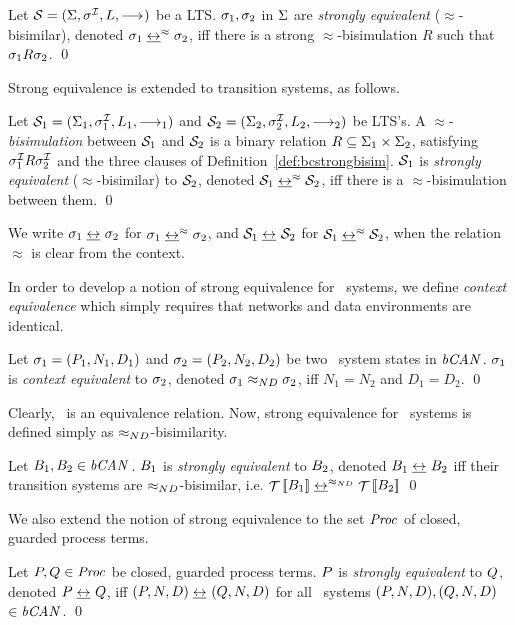 \begin{definition}
Let $\SS = (\States, \Init, \Labels, \TRel)$ be a LTS. $\state_1,
\state_2$ in $\States$ are \emph{strongly equivalent}
($\approx$-bisimilar), denoted $\state_1 \eqbisim \state_2$, iff there
is a strong $\approx$-bisimulation $R$ such that $\state_1 R \state_2$.
\qed
\end{definition}
Strong equivalence is extended to transition systems, as follows.
\begin{definition}\label{def:bcsbisimtsys}
Let $\SS_1 = (\States_1, \Init_1, \Labels_1, {}\lgoes{1}{})$ and
$\SS_2 = (\States_2, \Init_2, \Labels_2, {}\lgoes{2}{})$ be LTS's.
A $\approx$-\emph{bisimulation} between $\SS_1$ and $\SS_2$ is a binary 
relation $R \subseteq \States_1 \cross \States_2$, satisfying
$\Init_1 R \Init_2$ and the three clauses of 
Definition~\ref{def:bcstrongbisim}.
$\SS_1$ is \emph{strongly equivalent} ($\approx$-bisimilar)
to $\SS_2$, denoted $\SS_1 \eqbisim \SS_2$, iff there is a 
$\approx$-bisimulation between them.
\qed
\end{definition}

\begin{notation}
We write $\state_1 \bisim \state_2$ for $\state_1 \eqbisim \state_2$, and
$\SS_1 \bisim \SS_2$ for $\SS_1 \eqbisim \SS_2$, when the relation
$\approx$ is clear from the context.
\end{notation}

In order to develop a notion of strong equivalence for \bcandle\ systems,
we define \emph{context equivalence} which simply requires that
networks and data environments are identical. 
\begin{definition}
Let $\state_1 = (P_1,N_1,D_1)$ and $\state_2 = (P_2,N_2,D_2)$ be two 
\bcandle\ system states in $\Sys{}$. 
$\state_1$ is \emph{context equivalent} to $\state_2$, denoted
$\state_1 \ndequiv \state_2$, iff $N_1 = N_2$ and $D_1 = D_2$.
\qed
\end{definition}
Clearly, \ndequiv\ is an equivalence relation. Now,
strong equivalence for \bcandle\ systems is defined simply 
as $\ndequiv$-bisimilarity.
\begin{definition}
Let $\sys_1, \sys_2 \in \Sys{}$. $\sys_1$ is \emph{strongly equivalent}
to $\sys_2$, denoted $\sys_1 \bisim \sys_2$ iff their transition systems
are $\ndequiv$-bisimilar, i.e. $\TSys{\sys_1} \ndbisim \TSys{\sys_2}$
\qed
\end{definition}
We also extend the notion of strong equivalence to the set 
$\Proc{}$ of closed, guarded process terms. 
\begin{definition}
Let $\P, \Q \in \Proc{}$ be closed, guarded process terms.
$\P$ is \emph{strongly equivalent} to $\Q$, denoted
$\P \bisim \Q$, iff $(\P,\N,\D) \bisim (\Q,\N,\D)$ for all \bcandle\ 
systems $(\P,\N,\D), (\Q,\N,\D)$ $\in \Sys{}$.
\qed
\end{definition} 

